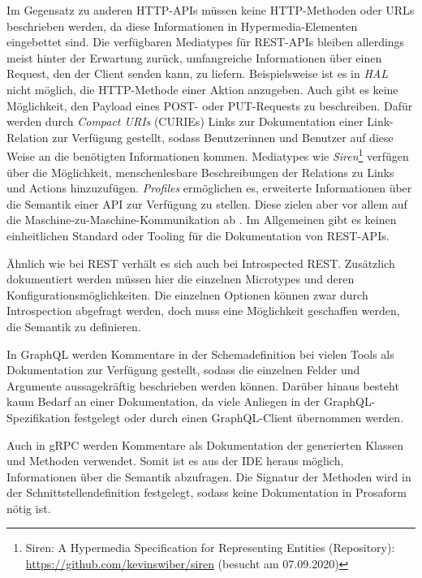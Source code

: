 \noindent{}Im Gegensatz zu anderen HTTP-APIs müssen keine HTTP-Methoden oder URLs beschrieben werden, da diese Informationen in Hypermedia-Elementen eingebettet sind. Die verfügbaren Mediatypes für REST-APIs bleiben allerdings meist hinter der Erwartung zurück, umfangreiche Informationen über einen Request, den der Client senden kann, zu liefern. Beispielsweise ist es in \emph{HAL} \autocite{Kelly2016} nicht möglich, die HTTP-Methode einer Aktion anzugeben. Auch gibt es keine Möglichkeit, den Payload eines POST- oder PUT-Requests zu beschreiben. Dafür werden durch \emph{Compact URIs} (CURIEs) \autocite{Birbeck2010} Links zur Dokumentation einer Link-Relation zur Verfügung gestellt, sodass Benutzerinnen und Benutzer auf diese Weise an die benötigten Informationen kommen. Mediatypes wie \emph{Siren}\footnote{Siren: A Hypermedia Specification for Representing Entities (Repository): \url{https://github.com/kevinswiber/siren} (besucht am 07.09.2020)} verfügen über die Möglichkeit, menschenlesbare Beschreibungen der Relations zu Links und Actions hinzuzufügen. \emph{Profiles} ermöglichen es, erweiterte Informationen über die Semantik einer API zur Verfügung zu stellen. Diese zielen aber vor allem auf die Maschine-zu-Maschine-Kommunikation ab \autocite{RFC6906}. Im Allgemeinen gibt es keinen einheitlichen Standard oder Tooling für die Dokumentation von REST-APIs.

Ähnlich wie bei REST verhält es sich auch bei Introspected REST. Zusätzlich dokumentiert werden müssen hier die einzelnen Microtypes und deren Konfigurationsmöglichkeiten. Die einzelnen Optionen können zwar durch Introspection abgefragt werden, doch muss eine Möglichkeit geschaffen werden, die Semantik zu definieren.

In GraphQL werden Kommentare in der Schemadefinition bei vielen Tools als Dokumentation zur Verfügung gestellt, sodass die einzelnen Felder und Argumente aussagekräftig beschrieben werden können. Darüber hinaus besteht kaum Bedarf an einer Dokumentation, da viele Anliegen in der GraphQL-Spezifikation festgelegt oder durch einen GraphQL-Client übernommen werden.

Auch in gRPC werden Kommentare als Dokumentation der generierten Klassen und Methoden verwendet. Somit ist es aus der IDE heraus möglich, Informationen über die Semantik abzufragen. Die Signatur der Methoden wird in der Schnittstellendefinition festgelegt, sodass keine Dokumentation in Prosaform nötig ist.


